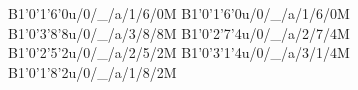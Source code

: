 B1'0'1'6'0u/0/_/a/1/6/0M
B1'0'1'6'0u/0/_/a/1/6/0M
B1'0'3'8'8u/0/_/a/3/8/8M
B1'0'2'7'4u/0/_/a/2/7/4M
B1'0'2'5'2u/0/_/a/2/5/2M
B1'0'3'1'4u/0/_/a/3/1/4M
B1'0'1'8'2u/0/_/a/1/8/2M
